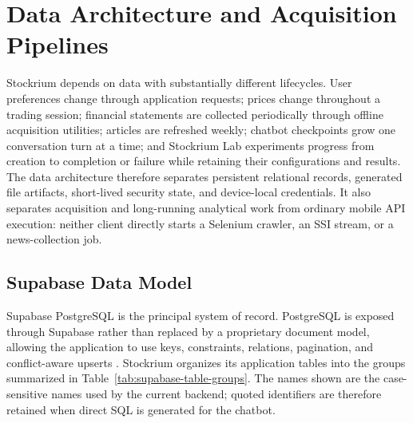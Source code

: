 \section{Data Architecture and Acquisition Pipelines}
\label{sec:data-architecture-acquisition}

Stockrium depends on data with substantially different lifecycles. User preferences change through application requests; prices change throughout a trading session; financial statements are collected periodically through offline acquisition utilities; articles are refreshed weekly; chatbot checkpoints grow one conversation turn at a time; and Stockrium Lab experiments progress from creation to completion or failure while retaining their configurations and results. The data architecture therefore separates persistent relational records, generated file artifacts, short-lived security state, and device-local credentials. It also separates acquisition and long-running analytical work from ordinary mobile API execution: neither client directly starts a Selenium crawler, an SSI stream, or a news-collection job.

\subsection{Supabase Data Model}
\label{subsec:supabase-data-model}

Supabase PostgreSQL is the principal system of record. PostgreSQL is exposed through Supabase rather than replaced by a proprietary document model, allowing the application to use keys, constraints, relations, pagination, and conflict-aware upserts \cite{supabaseDatabase2026}. Stockrium organizes its application tables into the groups summarized in Table~\ref{tab:supabase-table-groups}. The names shown are the case-sensitive names used by the current backend; quoted identifiers are therefore retained when direct SQL is generated for the chatbot.

